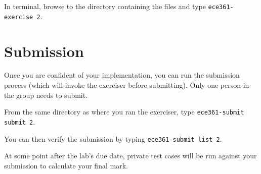\documentclass[11pt]{article}
\def\thelab{2}
\begin{document}
In terminal, browse to the directory containing the files and type \texttt{ece361-exercise \thelab}.


\section{Submission}
\label{sec:submission}
Once you are confident of your implementation, you can run the submission process (which will invoke the exerciser before submitting).
Only one person in the group needs to submit.

From the same directory as where you ran the exerciser, type \texttt{ece361-submit submit \thelab}.

You can then verify the submission by typing \texttt{ece361-submit list \thelab}.

At some point after the lab's due date, private test cases will be run against your submission to calculate your final mark.
\end{document}
